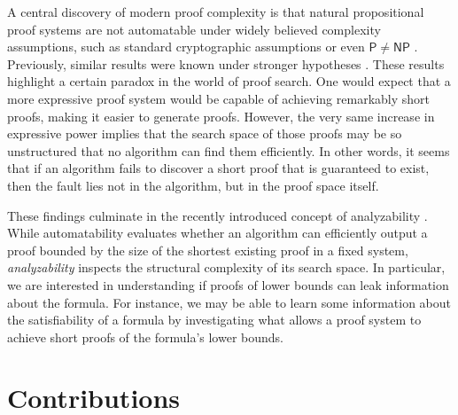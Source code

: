 A central discovery of modern proof complexity is that natural propositional proof systems are not automatable under widely believed complexity assumptions, such as standard cryptographic assumptions \cite{kraj_pud_crypto, fis_int_weak_aut,ac0_crypto} or even $\mathsf{P} \neq \mathsf{NP}$ \cite{res_nphard,alg_nphard,cp_nphard,resk_nphard,ac0f_nphard,obdd_nphard,eth_hard_treeres}. Previously, similar results were known under stronger hypotheses \cite{res_wphard, res_hard_proofs,pc_wphard}. These results highlight a certain paradox in the world of proof search. One would expect that a more expressive proof system would be capable of achieving remarkably short proofs, making it easier to generate proofs. However, the very same increase in expressive power implies that the search space of those proofs may be so unstructured that no algorithm can find them efficiently. In other words, it seems that if an algorithm fails to discover a short proof that is guaranteed to exist, then the fault lies not in the algorithm, but in the proof space itself.

These findings culminate in the recently introduced concept of analyzability \cite{pap}. While automatability evaluates whether an algorithm can efficiently output a proof bounded by the size of the shortest existing proof in a fixed system, \textit{analyzability} inspects the structural complexity of its search space. In particular, we are interested in understanding if proofs of lower bounds can leak information about the formula. For instance, we may be able to learn some information about the satisfiability of a formula by investigating what allows a proof system to achieve short proofs of the formula's lower bounds.

\section*{Contributions}

